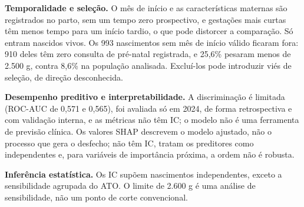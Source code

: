 \documentclass[10pt,a4paper]{article}
\newcommand{\secao}[2]{\par\needspace{6\baselineskip}\vspace{8pt}{\color{iptescuro}\bfseries\large{\color{iptazul}#1}~#2}\par
  \vspace{-2pt}{\color{iptgrade}\rule{\linewidth}{0.8pt}}\par\vspace{1pt}}
\begin{document}
{\color{iptescuro}\bfseries Temporalidade e seleção.} O mês de início e as características maternas são registrados no parto, sem um tempo zero prospectivo, e gestações mais curtas têm menos tempo para um início tardio, o que pode distorcer a comparação. Só entram nascidos vivos. Os 993 nascimentos sem mês de início válido ficaram fora: 910 deles têm zero consulta de pré-natal registrada, e 25,6\% pesaram menos de 2.500 g, contra 8,6\% na população analisada. Excluí-los pode introduzir viés de seleção, de direção desconhecida.\par

{\color{iptescuro}\bfseries Desempenho preditivo e interpretabilidade.} A discriminação é limitada (ROC-AUC de 0,571 e 0,565), foi avaliada só em 2024, de forma retrospectiva e com validação interna, e as métricas não têm IC; o modelo não é uma ferramenta de previsão clínica. Os valores SHAP descrevem o modelo ajustado, não o processo que gera o desfecho; não têm IC, tratam os preditores como independentes e, para variáveis de importância próxima, a ordem não é robusta.\par

{\color{iptescuro}\bfseries Inferência estatística.} Os IC supõem nascimentos independentes, exceto a sensibilidade agrupada do ATO. O limite de 2.600 g é uma análise de sensibilidade, não um ponto de corte convencional.\par

\secao{6.}{Síntese dos resultados}
\end{document}
